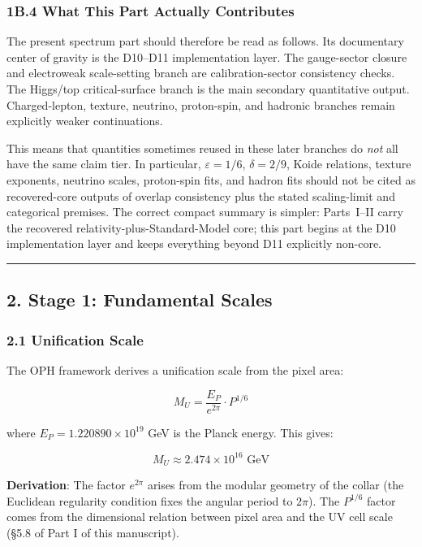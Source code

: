\subsubsection{1B.4 What This Part Actually Contributes}\label{1b4-what-oph-achieves}

The present spectrum part should therefore be read as follows. Its documentary center of gravity is the D10--D11 implementation layer. The gauge-sector closure and electroweak scale-setting branch are calibration-sector consistency checks. The Higgs/top critical-surface branch is the main secondary quantitative output. Charged-lepton, texture, neutrino, proton-spin, and hadronic branches remain explicitly weaker continuations.

This means that quantities sometimes reused in these later branches do \emph{not} all have the same claim tier. In particular, \(\varepsilon=1/6\), \(\delta=2/9\), Koide relations, texture exponents, neutrino scales, proton-spin fits, and hadron fits should not be cited as recovered-core outputs of overlap consistency plus the stated scaling-limit and categorical premises. The correct compact summary is simpler: Parts~I--II carry the recovered relativity-plus-Standard-Model core; this part begins at the D10 implementation layer and keeps everything beyond D11 explicitly non-core.

\begin{center}\rule{0.5\linewidth}{0.5pt}\end{center}

\subsection{2. Stage 1: Fundamental Scales}\label{2-stage-1-fundamental-scales}

\subsubsection{2.1 Unification Scale}\label{21-unification-scale}

The OPH framework derives a unification scale from the pixel area:

\[M_U = \frac{E_P}{e^{2\pi}} \cdot P^{1/6}\]

where \(E_P = 1.220890 \times 10^{19}\) GeV is the Planck energy. This gives:

\[M_U \approx 2.474 \times 10^{16} \text{ GeV}\]

\textbf{Derivation}: The factor \(e^{2\pi}\) arises from the modular geometry of the collar (the Euclidean regularity condition fixes the angular period to \(2\pi\)). The \(P^{1/6}\) factor comes from the dimensional relation between pixel area and the UV cell scale (§5.8 of Part I of this manuscript).

